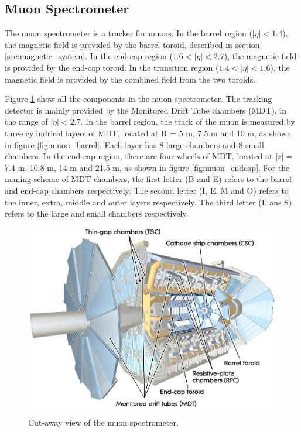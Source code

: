 \subsection{Muon Spectrometer}
The muon spectrometer is a tracker for muons.
In the barrel region ($|\eta| < 1.4$), the magnetic field is provided by the barrel toroid, described in section \ref{sec:magnetic_system}.
In the end-cap region ($1.6 < |\eta| < 2.7$), the magnetic field is provided by the end-cap toroid.
In the transition region ($1.4 < |\eta| < 1.6$), the magnetic field is provided by the combined field from the two toroids.

Figure \ref{fig:muon_spectrometer} show all the components in the muon spectrometer.
The tracking detector is mainly provided by the Monitored Drift Tube chambers (MDT), in the range of $|\eta| < 2.7$.
In the barrel region, the track of the muon is measured by three cylindrical layers of MDT, located at R = 5 m, 7.5 m and 10 m, as shown in figure \ref{fig:muon_barrel}.
Each layer has 8 large chambers and 8 small chambers.
In the end-cap region, there are four wheels of MDT, located at $|z|=$ 7.4 m, 10.8 m, 14 m and 21.5 m, as shown in figure \ref{fig:muon_endcap}.
For the naming scheme of MDT chambers, the first letter (B and E) refers to the barrel and end-cap chambers respectively.
The second letter (I, E, M and O) refers to the inner, extra, middle and outer layers respectively.
The third letter (L ans S) refers to the large and small chambers respectively.

\begin{figure}
\centering
\includegraphics[width=\textwidth]{data/photo/detector/muon_spectrometer.jpg}
\caption{Cut-away view of the muon spectrometer. \cite{muon_spectrometer}}
\label{fig:muon_spectrometer}
\end{figure}

